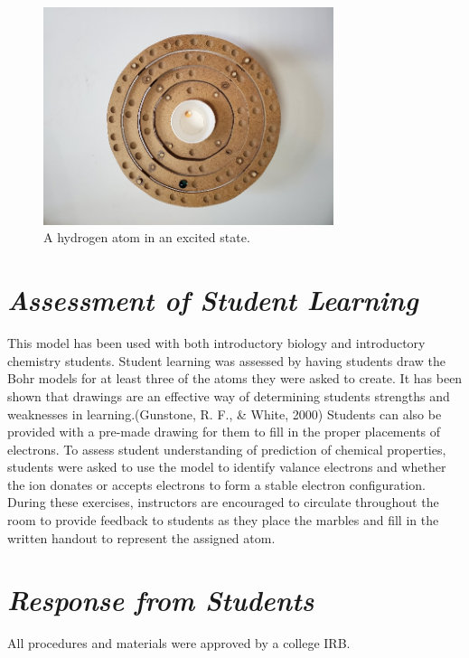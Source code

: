 \documentclass[11pt]{sig-alternate}
\begin{document}
\begin{large}
\begin{figure}[htp]
    \centering
    \includegraphics[width=8.5cm]{Figure5.png}
    \caption{A hydrogen atom in an excited state.}
    \label{CA hydrogen atom in an excited state.}
    \label{Figure shows 3D cardboard Bohr model showing an excited state of Hydrogen. The excites state is indicated by the blue marble being placed in the second orbital.}
\end{figure}


\section*{\textit{Assessment of Student Learning}}

This model has been used with both introductory biology and introductory chemistry students.  Student learning was assessed by having students draw the Bohr models for at least three of the atoms they were asked to create.  It has been shown that drawings are an effective way of determining students strengths and weaknesses in learning.(Gunstone, R. F., & White, 2000)  Students can also be provided with a pre-made drawing for them to fill in the proper placements of electrons.
To assess student understanding of prediction of chemical properties, students were asked to use the model to identify valance electrons and whether the ion donates or accepts electrons to form a stable electron configuration.
During these exercises, instructors are encouraged to circulate throughout the room to provide feedback to students as they place the marbles and fill in the written handout to represent the assigned atom.


\section*{\textit{Response from Students}}

All procedures and materials were approved by a college IRB.


\end{large}
\end{document}
